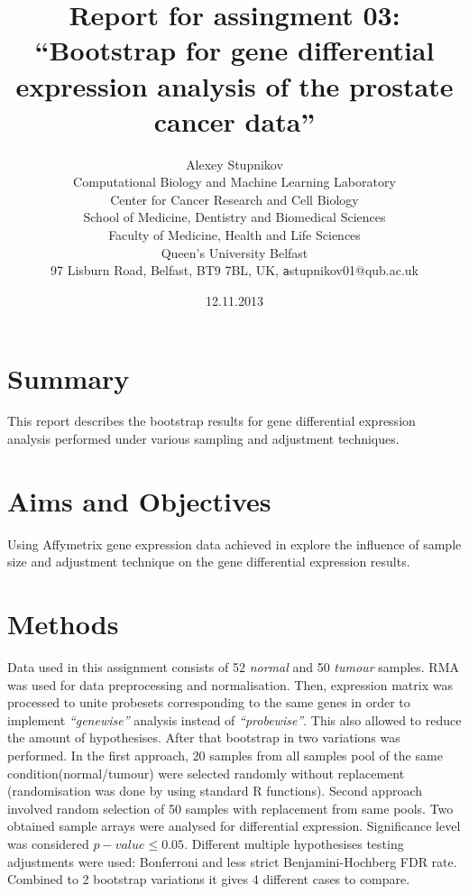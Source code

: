 \documentclass[11pt,a4paper,oneside]{article}
\begin{document}
\title{Report for assingment 03:\\ ``Bootstrap for gene differential expression analysis of the prostate cancer data''}

\author{Alexey Stupnikov\\
Computational Biology and Machine Learning Laboratory\\ Center for Cancer Research and Cell Biology\\ School of Medicine, Dentistry and Biomedical Sciences\\  Faculty of Medicine, Health and Life Sciences\\ Queen's University Belfast\\ 97 Lisburn Road, Belfast, BT9 7BL, UK, \texttt astupnikov01@qub.ac.uk
}

\date{12.11.2013}
\maketitle

\newpage
\setcounter{secnumdepth}{1}

\section{Summary}

This report describes the bootstrap results for gene differential expression analysis performed under various sampling and adjustment techniques.




\section{Aims and Objectives}


Using Affymetrix gene expression data achieved in \cite{singh2002gene} explore the influence of sample size and adjustment technique on the gene differential expression results. 




\section{Methods}

Data used in this assignment consists of 52 \emph{normal} and 50 \emph{tumour} samples.
RMA was used for data preprocessing and normalisation. Then, expression matrix was processed to unite probesets corresponding to the same genes in order to implement \emph{``genewise''} analysis instead of \emph{``probewise''}. This also allowed to reduce the amount of hypothesises. 
After that bootstrap in two variations was performed. In the first approach, 20 samples from all samples pool of the same condition(normal/tumour) were selected randomly without replacement (randomisation was done by using standard R functions). Second approach involved random selection of 50 samples with replacement from same pools.
Two obtained sample arrays were analysed for differential expression. Significance level was considered $p-value \leq 0.05$. Different multiple hypothesises testing adjustments were used: Bonferroni and less strict Benjamini-Hochberg FDR rate. Combined to 2 bootstrap variations it gives 4 different cases to compare.
\end{document}
